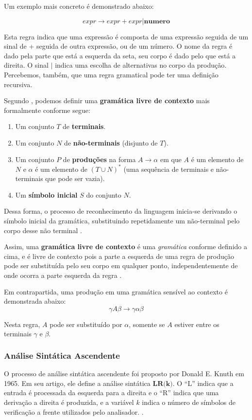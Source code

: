 Um exemplo mais concreto é demonstrado abaixo:

\[
expr \rightarrow expr + expr | \textbf{numero}
\]

Esta regra indica que uma expressão é composta de uma expressão seguida de um
sinal de + seguida de outra expressão, ou de um número. O nome da regra é dado
pela parte que está a esquerda da seta, seu corpo é dado pelo que está a
direita. O sinal \(|\) indica uma escolha de alternativas no corpo da
produção. Percebemos, também, que uma regra gramatical pode ter uma
definição recursiva.

Segundo , podemos definir uma \textbf{gramática livre de
contexto} mais formalmente conforme segue:
\begin{enumerate}
	\item Um conjunto \(T\) de \textbf{terminais}.
	\item Um conjunto \(N\) de \textbf{não-terminais} (disjunto de \(T\)).
	\item Um conjunto \(P\) de \textbf{produções} na forma \(A \rightarrow \alpha\)
				em que \(A\) é um elemento de \(N\) e \(\alpha\) é um elemento de
				\((T \cup N)^*\) (uma sequência de terminais e não-terminais que
				pode ser vazia).
	\item Um \textbf{símbolo inicial} \(S\) do conjunto \(N\).
\end{enumerate}

Dessa forma, o processo de reconhecimento da linguagem inicia-se derivando o
símbolo inicial da gramática, substituindo repetidamente um não-terminal pelo
corpo desse não terminal \cite{new-dragon-pt}.

Assim, uma \textbf{gramática livre de contexto} é uma \emph{gramática}
conforme definido a cima, e é livre de contexto pois a parte a esquerda de uma
regra de produção pode ser substituída pelo seu corpo em qualquer ponto,
independentemente de onde ocorra a parte esquerda da regra \cite{louden97-pt}.

Em contrapartida, uma produção em uma gramática sensível ao contexto é demonstrada
abaixo:
\[
	\gamma{}A{}\beta \rightarrow \gamma\alpha\beta
\]

Nesta regra, \(A\) pode ser substituído por \(\alpha\), somente se
\(A\) estiver entre os terminais \(\gamma\) e \(\beta\).

\subsubsection{Análise Sintática Ascendente}
\label{sec:asc_syntax_analisys}
O processo de análise sintática ascendente foi proposto por Donald E. Knuth
em 1965. Em seu artigo, ele define a análise sintática $\textbf{LR(k)}$. O
``L'' indica que a entrada é processada da esquerda para a direita e o ``R''
indica que uma derivação a direita é produzida, e a variável $k$ indica
o número de símbolos de verificação a frente utilizados pelo analisador.
\cite{louden97-pt}.

